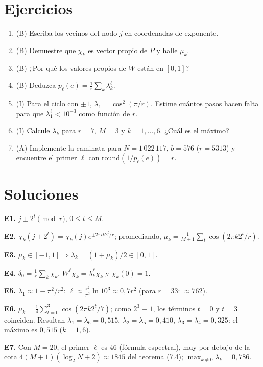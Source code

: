 \documentclass[11pt,a4paper]{article}
\begin{document}
\section{Ejercicios}
\begin{enumerate}[label=\textbf{E\arabic*.}]
\item (B) Escriba los vecinos del nodo $j$ en coordenadas de exponente.
\item (B) Demuestre que $\chi_k$ es vector propio de $P$ y halle $\mu_k$.
\item (B) ¿Por qué los valores propios de $W$ están en $[0,1]$?
\item (B) Deduzca $p_\ell(e)=\frac1r\sum_k\lambda_k^\ell$.
\item (I) Para el ciclo con $\pm1$, $\lambda_1=\cos^2(\pi/r)$. Estime cuántos pasos hacen falta para que $\lambda_1^\ell<10^{-3}$ como función de $r$.
\item (I) Calcule $\lambda_k$ para $r=7$, $M=3$ y $k=1,\dots,6$. ¿Cuál es el máximo?
\item (A) Implemente la caminata para $N=1\,022\,117$, $b=576$ ($r=5313$) y encuentre el primer $\ell$ con $\mathrm{round}(1/p_\ell(e))=r$.
\end{enumerate}
\section{Soluciones}
\begin{solucion}
\textbf{E1.} $j\pm2^t\pmod r$, $0\le t\le M$.

\textbf{E2.} $\chi_k(j\pm2^t)=\chi_k(j)e^{\pm2\pi ik2^t/r}$; promediando, $\mu_k=\frac1{M+1}\sum_t\cos(2\pi k2^t/r)$.

\textbf{E3.} $\mu_k\in[-1,1]\Rightarrow\lambda_k=(1+\mu_k)/2\in[0,1]$.

\textbf{E4.} $\delta_0=\frac1r\sum_k\chi_k$, $W^\ell\chi_k=\lambda_k^\ell\chi_k$ y $\chi_k(0)=1$.

\textbf{E5.} $\lambda_1\approx1-\pi^2/r^2$: $\ell\approx\frac{r^2}{\pi^2}\ln10^3\approx0{,}7r^2$ (para $r=33$: $\approx762$).

\textbf{E6.} $\mu_k=\frac14\sum_{t=0}^3\cos(2\pi k2^t/7)$; como $2^3\equiv1$, los términos $t=0$ y $t=3$ coinciden. Resultan $\lambda_{1}=\lambda_6=0{,}515$, $\lambda_2=\lambda_5=0{,}410$, $\lambda_3=\lambda_4=0{,}325$: el máximo es $0{,}515$ ($k=1,6$).

\textbf{E7.} Con $M=20$, el primer $\ell$ es $46$ (fórmula espectral), muy por debajo de la cota $4(M+1)(\log_2N+2)\approx1845$ del teorema (7.4); $\max_{k\ne0}\lambda_k=0{,}786$.
\end{solucion}
\end{document}
